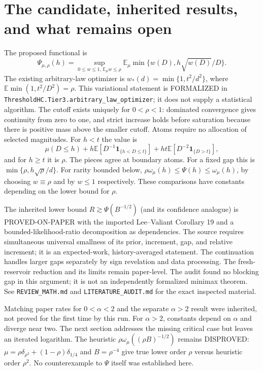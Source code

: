 \documentclass[11pt]{article}
\newcommand{\E}{\mathbb E}
\newcommand{\ind}{\mathbf 1}
\begin{document}
\section{The candidate, inherited results, and what remains open}
The proposed functional is
\[
 \Psi_{\mu,\rho}(h)=\sup_{0\le w\le1,\,\E_\mu w\le\rho}
       \E_\mu\min\{w(D),h\sqrt{w(D)}/D\}.
\]
The existing arbitrary-law optimizer is
$w_*(d)=\min\{1,t^2/d^2\}$, where $\E\min(1,t^2/D^2)=\rho$.
This variational statement is FORMALIZED in
\texttt{ThresholdHC.Tier3.arbitrary\_law\_optimizer}; it does not supply a
statistical algorithm. The cutoff exists uniquely for $0<\rho<1$:
dominated convergence gives continuity from zero to one, and strict increase
holds before saturation because there is positive mass above the smaller
cutoff. Atoms require no allocation of selected magnitudes.
For $h<t$ the value is
\[
 \mu(D\le h)+h\E[D^{-1}\ind_{\{h<D\le t\}}]
       +ht\E[D^{-2}\ind_{\{D>t\}}],
\]
and for $h\ge t$ it is $\rho$. The pieces agree at boundary atoms.
For a fixed gap this is $\min\{\rho,h\sqrt\rho/d\}$.
For rarity bounded below, $\rho\omega_\mu(h)\le\Psi(h)\le\omega_\mu(h)$,
by choosing $w\equiv\rho$ and by $w\le1$ respectively.
These comparisons have constants depending on the lower bound for $\rho$.

The inherited lower bound $R\gtrsim\Psi(B^{-1/2})$ (and its confidence
analogue) is PROVED-ON-PAPER with the imported Lee--Valiant Corollary 19
and a bounded-likelihood-ratio decomposition as dependencies. The source
requires simultaneous universal smallness of its prior, increment, gap,
and relative increment; it is an expected-work, history-averaged statement.
The continuation handles larger gaps separately by sign revelation and data
processing. The fresh-reservoir reduction and its limits remain paper-level.
The audit found no blocking gap in this argument; it is not an independently
formalized minimax theorem. See \texttt{REVIEW\_MATH.md} and
\texttt{LITERATURE\_AUDIT.md} for the exact inspected material.

Matching paper rates for $0<\alpha<2$ and the separate $\alpha>2$ result
were inherited, not proved for the first time by this run. For $\alpha>2$,
constants depend on $\alpha$ and diverge near two. The next section addresses
the missing critical case but leaves an iterated logarithm.
The heuristic $\rho\omega_\mu((\rho B)^{-1/2})$ remains DISPROVED:
$\mu=\rho\delta_{\rho^2}+(1-\rho)\delta_{1/4}$ and $B=\rho^{-4}$ give
true lower order $\rho$ versus heuristic order $\rho^2$.
No counterexample to $\Psi$ itself was established here.
\end{document}
